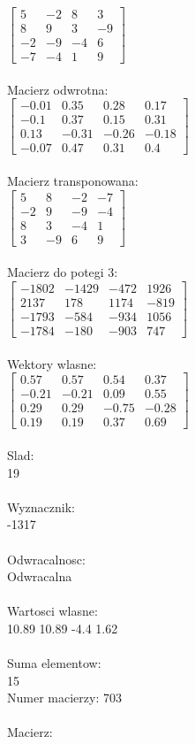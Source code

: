 \documentclass[a4paper,12pt]{article}
\begin{document}
$\begin{bmatrix} 5&-2&8&3\\8&9&3&-9\\-2&-9&-4&6\\-7&-4&1&9 \end{bmatrix}$
\\
\\
Macierz odwrotna:\\

$\begin{bmatrix} -0.01&0.35&0.28&0.17\\-0.1&0.37&0.15&0.31\\0.13&-0.31&-0.26&-0.18\\-0.07&0.47&0.31&0.4 \end{bmatrix}$
\\
\\
Macierz transponowana:\\

$\begin{bmatrix} 5&8&-2&-7\\-2&9&-9&-4\\8&3&-4&1\\3&-9&6&9 \end{bmatrix}$
\\
\\
Macierz do potegi 3:\\

$\begin{bmatrix} -1802&-1429&-472&1926\\2137&178&1174&-819\\-1793&-584&-934&1056\\-1784&-180&-903&747 \end{bmatrix}$
\\
\\
Wektory wlasne:\\

$\begin{bmatrix} 0.57&0.57&0.54&0.37\\-0.21&-0.21&0.09&0.55\\0.29&0.29&-0.75&-0.28\\0.19&0.19&0.37&0.69 \end{bmatrix}$
\\
\\
Slad:\\
19
\\
\\
Wyznacznik:\\
-1317
\\
\\
Odwracalnosc:\\
Odwracalna
\\
\\
Wartosci wlasne:\\
10.89 10.89 -4.4 1.62
\\
\\
Suma elementow:\\
15
\\
\newpage
Numer macierzy:
703
\\
\\
Macierz:\\
\end{document}
